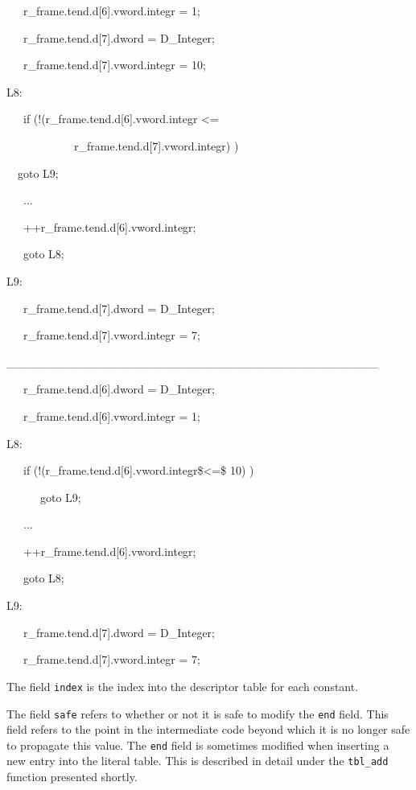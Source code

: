 {\ttfamily\mdseries
\ \ \ r\_frame.tend.d[6].vword.integr = 1;}

{\ttfamily\mdseries
\ \ \ r\_frame.tend.d[7].dword = D\_Integer;}

{\ttfamily\mdseries
\ \ \ r\_frame.tend.d[7].vword.integr = 10;}

{\ttfamily\mdseries
L8:}

{\ttfamily\mdseries
\ \ \ if (!(r\_frame.tend.d[6].vword.integr {\textless}=}

{\ttfamily\mdseries
\ \ \ \ \ \ \ \ \ \ \ \ r\_frame.tend.d[7].vword.integr) )}

{\ttfamily\mdseries
\ \ goto L9;}

{\ttfamily\mdseries
\ \ \ ...}

{\ttfamily\mdseries
\ \ \ ++r\_frame.tend.d[6].vword.integr;}

{\ttfamily\mdseries
\ \ \ goto L8;}

{\ttfamily\mdseries
L9:}

{\ttfamily\mdseries
\ \ \ r\_frame.tend.d[7].dword = D\_Integer;}

{\ttfamily\mdseries
\ \ \ r\_frame.tend.d[7].vword.integr = 7;}

{\ttfamily\mdseries
\_\_\_\_\_\_\_\_\_\_\_\_\_\_\_\_\_\_\_\_\_\_\_\_\_\_\_\_\_\_\_\_\_\_\_\_\_\_\_\_\_\_\_\_}


\bigskip

{\ttfamily\mdseries
\ \ \ r\_frame.tend.d[6].dword = D\_Integer;}

{\ttfamily\mdseries
\ \ \ r\_frame.tend.d[6].vword.integr = 1;}

{\ttfamily\mdseries
L8:}

{\ttfamily\mdseries
\ \ \ if (!(r\_frame.tend.d[6].vword.integr\${\textless}=\$ 10) )}

{\ttfamily\mdseries
\ \ \ \ \ \ goto L9;}

{\ttfamily\mdseries
\ \ \ ...}

{\ttfamily\mdseries
\ \ \ ++r\_frame.tend.d[6].vword.integr;}

{\ttfamily\mdseries
\ \ \ goto L8;}

{\ttfamily\mdseries
L9:}

{\ttfamily\mdseries
\ \ \ r\_frame.tend.d[7].dword = D\_Integer;}

{\ttfamily\mdseries
\ \ \ r\_frame.tend.d[7].vword.integr = 7;}


The field \texttt{index} is the index into the descriptor table for
each constant.


The field \texttt{safe} refers to whether or not it is safe to modify
the \texttt{end} field. This field refers to the point in the
intermediate code beyond which it is no longer safe to propagate this
value. The \texttt{end} field is sometimes modified when inserting a
new entry into the literal table. This is described in detail under
the \texttt{tbl\_add} function presented shortly.



